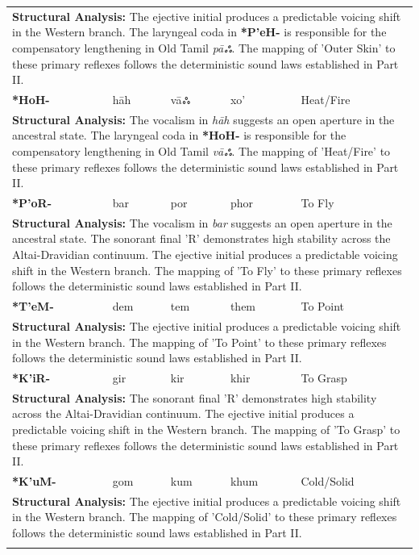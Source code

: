 \begin{longtable}{p{} p{} p{} p{} p{}}
\multicolumn{5}{p{\textwidth}}{\small \textbf{Structural Analysis:} The ejective initial produces a predictable voicing shift in the Western branch. The laryngeal coda in \textbf{*P'eH-} is responsible for the compensatory lengthening in Old Tamil \textit{pāஃ}. The mapping of 'Outer Skin' to these primary reflexes follows the deterministic sound laws established in Part II.} \\ \addlinespace[15pt] 
\textbf{*HoH-} & hāh & vāஃ & xo' & Heat/Fire \\ 
\multicolumn{5}{p{\textwidth}}{\small \textbf{Structural Analysis:} The vocalism in \textit{hāh} suggests an open aperture in the ancestral state. The laryngeal coda in \textbf{*HoH-} is responsible for the compensatory lengthening in Old Tamil \textit{vāஃ}. The mapping of 'Heat/Fire' to these primary reflexes follows the deterministic sound laws established in Part II.} \\ \addlinespace[15pt] 
\textbf{*P'oR-} & bar & por & phor & To Fly \\ 
\multicolumn{5}{p{\textwidth}}{\small \textbf{Structural Analysis:} The vocalism in \textit{bar} suggests an open aperture in the ancestral state. The sonorant final 'R' demonstrates high stability across the Altai-Dravidian continuum. The ejective initial produces a predictable voicing shift in the Western branch. The mapping of 'To Fly' to these primary reflexes follows the deterministic sound laws established in Part II.} \\ \addlinespace[15pt] 
\textbf{*T'eM-} & dem & tem & them & To Point \\ 
\multicolumn{5}{p{\textwidth}}{\small \textbf{Structural Analysis:} The ejective initial produces a predictable voicing shift in the Western branch. The mapping of 'To Point' to these primary reflexes follows the deterministic sound laws established in Part II.} \\ \addlinespace[15pt] 
\textbf{*K'iR-} & gir & kir & khir & To Grasp \\ 
\multicolumn{5}{p{\textwidth}}{\small \textbf{Structural Analysis:} The sonorant final 'R' demonstrates high stability across the Altai-Dravidian continuum. The ejective initial produces a predictable voicing shift in the Western branch. The mapping of 'To Grasp' to these primary reflexes follows the deterministic sound laws established in Part II.} \\ \addlinespace[15pt] 
\textbf{*K'uM-} & gom & kum & khum & Cold/Solid \\ 
\multicolumn{5}{p{\textwidth}}{\small \textbf{Structural Analysis:} The ejective initial produces a predictable voicing shift in the Western branch. The mapping of 'Cold/Solid' to these primary reflexes follows the deterministic sound laws established in Part II.} \\ \addlinespace[15pt] 

\end{longtable}
